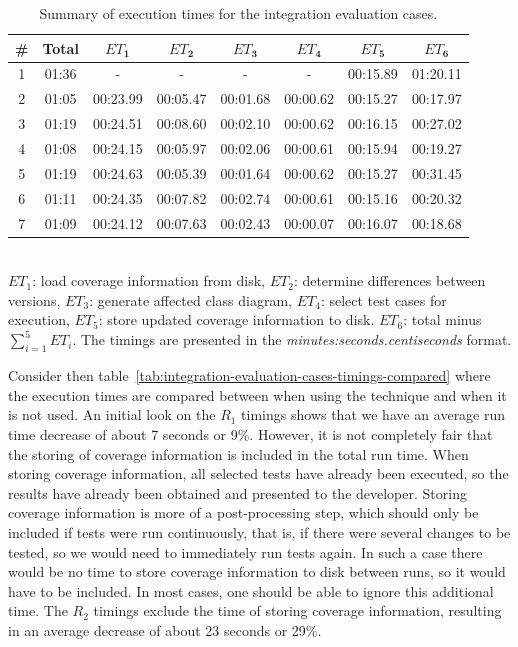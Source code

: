 \documentclass[a4paper,english,12pt]{report}
\begin{document}
\begin{table}[htbp]
  \centering
  \begin{tabular}{|c|c|c|c|c|c|c|c|}
    \hline
    \textbf{\#} & \textbf{Total} & $\boldsymbol{\mathit{ET}_1}$ & $\boldsymbol{\mathit{ET}_2}$ & $\boldsymbol{\mathit{ET}_3}$ & $\boldsymbol{\mathit{ET}_4}$ & $\boldsymbol{\mathit{ET}_5}$ & $\boldsymbol{\mathit{ET}_6}$\\
    \hline
    1 & 01:36 & - & - & - & - & 00:15.89 & 01:20.11\\
    \hline
    2 & 01:05 & 00:23.99 & 00:05.47 & 00:01.68 & 00:00.62 & 00:15.27 & 00:17.97\\
    \hline
    3 & 01:19 & 00:24.51 & 00:08.60 & 00:02.10 & 00:00.62 & 00:16.15 & 00:27.02\\
    \hline
    4 & 01:08 & 00:24.15 & 00:05.97 & 00:02.06 & 00:00.61 & 00:15.94 & 00:19.27\\
    \hline
    5 & 01:19 & 00:24.63 & 00:05.39 & 00:01.64 & 00:00.62 & 00:15.27 & 00:31.45\\
    \hline
    6 & 01:11 & 00:24.35 & 00:07.82 & 00:02.74 & 00:00.61 & 00:15.16 & 00:20.32\\
    \hline
    7 & 01:09 & 00:24.12 & 00:07.63 & 00:02.43 & 00:00.07 & 00:16.07 & 00:18.68\\
    \hline
  \end{tabular}
    {\\[2ex]\footnotesize$\mathit{ET}_1$: load coverage information from disk, $\mathit{ET}_2$: determine differences between versions, $\mathit{ET}_3$: generate affected class diagram, $\mathit{ET}_4$: select test cases for execution, $\mathit{ET}_5$: store updated coverage information to disk. $\mathit{ET}_6$: total minus $\sum_{i=1}^{5} \mathit{ET}_i$. The timings are presented in the \textit{minutes:seconds.centiseconds} format.}
  \caption{Summary of execution times for the integration evaluation cases.}
  \label{tab:integration-evaluation-cases-timings}
\end{table}

Consider then table~\vref{tab:integration-evaluation-cases-timings-compared} where the execution times are compared between when using the technique and when it is not used. An initial look on the $R_1$ timings shows that we have an average run time decrease of about 7 seconds or 9\%. However, it is not completely fair that the storing of coverage information is included in the total run time. When storing coverage information, all selected tests have already been executed, so the results have already been obtained and presented to the developer. Storing coverage information is more of a post-processing step, which should only be included if tests were run continuously, that is, if there were several changes to be tested, so we would need to immediately run tests again. In such a case there would be no time to store coverage information to disk between runs, so it would have to be included. In most cases, one should be able to ignore this additional time. The $R_2$ timings exclude the time of storing coverage information, resulting in an average decrease of about 23 seconds or 29\%.
\end{document}
